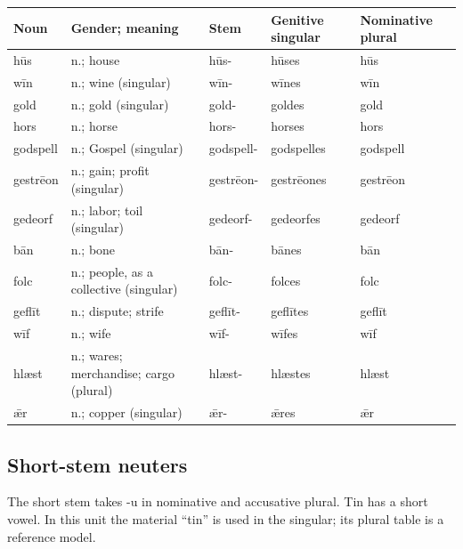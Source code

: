 \par\begingroup
\fontsize{10.5}{13.2}\selectfont
\setlength{\LTleft}{0pt}\setlength{\LTright}{\fill}
\noindent
\begin{tabular}{@{}>{\raggedright\arraybackslash}p{16.11mm}>{\raggedright\arraybackslash}p{38.17mm}>{\raggedright\arraybackslash}p{16.11mm}>{\raggedright\arraybackslash}p{21.18mm}>{\raggedright\arraybackslash}p{21.18mm}@{}}
\toprule
\textbf{Noun} & \textbf{Gender; meaning} & \textbf{Stem} & \textbf{Genitive singular} & \textbf{Nominative plural} \\
\midrule
hūs & n.; house & hūs- & hūses & hūs \\
wīn & n.; wine (singular) & wīn- & wīnes & wīn \\
gold & n.; gold (singular) & gold- & goldes & gold \\
hors & n.; horse & hors- & horses & hors \\
godspell & n.; Gospel (singular) & godspell- & godspelles & godspell \\
gestrēon & n.; gain; profit (singular) & gestrēon- & gestrēones & gestrēon \\
gedeorf & n.; labor; toil (singular) & gedeorf- & gedeorfes & gedeorf \\
bān & n.; bone & bān- & bānes & bān \\
folc & n.; people, as a collective (singular) & folc- & folces & folc \\
geflīt & n.; dispute; strife & geflīt- & geflītes & geflīt \\
wīf & n.; wife & wīf- & wīfes & wīf \\
hlæst & n.; wares; merchandise; cargo (plural) & hlæst- & hlæstes & hlæst \\
ǣr & n.; copper (singular) & ǣr- & ǣres & ǣr \\
\bottomrule
\end{tabular}
\par\endgroup

\subsection*{Short-stem neuters}

The short stem takes -u in nominative and accusative plural. Tin has a short vowel. In this unit the material “tin” is used in the singular; its plural table is a reference model.

